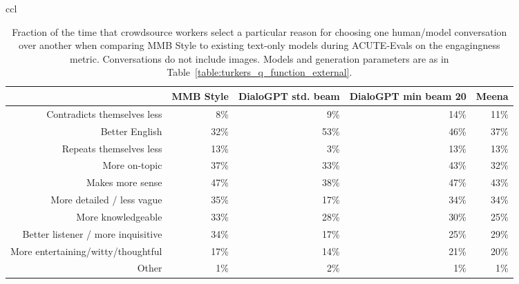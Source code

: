 \documentclass[11pt,a4paper]{article}
\begin{document}
\begin{table*}[t!]
\begin{adjustbox}{center=15.5cm}
\begin{small}
\begin{tabular*}{\textwidth}{ccl}
\begin{table*}[t]
\begin{center}
\small
\begin{tabular}{r|rrrr}
\hline
& MMB Style & DialoGPT std. beam & DialoGPT min beam 20 & Meena \\
\hline
Contradicts themselves less & 8\% & 9\% & 14\% & 11\% \\
Better English & 32\% & 53\% & 46\% & 37\% \\
Repeats themselves less & 13\% & 3\% & 13\% & 13\% \\
More on-topic & 37\% & 33\% & 43\% & 32\% \\
Makes more sense & 47\% & 38\% & 47\% & 43\% \\
More detailed / less vague & 35\% & 17\% & 34\% & 34\% \\
More knowledgeable & 33\% & 28\% & 30\% & 25\% \\
Better listener / more inquisitive & 34\% & 17\% & 25\% & 29\% \\
More entertaining/witty/thoughtful & 17\% & 14\% & 21\% & 20\% \\
Other & 1\% & 2\% & 1\% & 1\% \\
\hline
\end{tabular}
\caption{Fraction of the time that crowdsource workers select a particular reason for choosing one human/model conversation over another when comparing MMB Style to existing text-only models during ACUTE-Evals on the engagingness metric. Conversations do not include images. Models and generation parameters are as in Table~\ref{table:turkers_q_function_external}.
\label{table:q_function_external_engaging_checkbox_reasons}
}
\end{center}
\end{table*}


\end{tabular*}
\end{small}
\end{adjustbox}
\end{table*}
\end{document}
